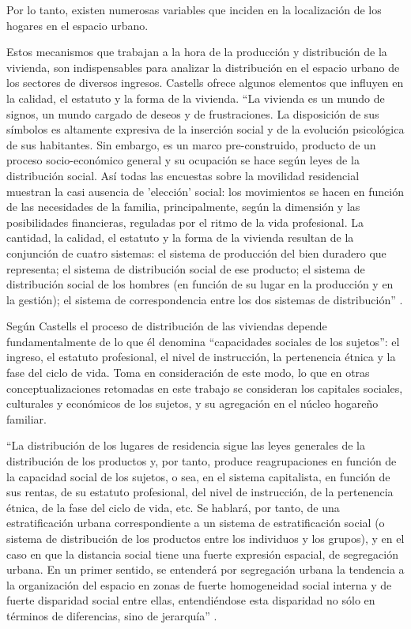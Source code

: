 Por lo tanto, existen numerosas variables que inciden en la localización de los hogares en el espacio urbano.

Estos mecanismos que trabajan a la hora de la producción y distribución de la vivienda, son indispensables para analizar la distribución en el espacio urbano de los sectores de diversos ingresos. Castells ofrece algunos elementos que influyen en la calidad, el estatuto y la forma de la vivienda. “La vivienda es un mundo de signos, un mundo cargado de deseos y de frustraciones. La disposición de sus símbolos es altamente expresiva de la inserción social y de la evolución psicológica de sus habitantes. Sin embargo, es un marco pre-construido, producto de un proceso socio-económico general y su ocupación se hace según leyes de la distribución social. Así todas las encuestas sobre la movilidad residencial muestran la casi ausencia de 'elección' social: los movimientos se hacen en función de las necesidades de la familia, principalmente, según la dimensión y las posibilidades financieras, reguladas por el ritmo de la vida profesional. La cantidad, la calidad, el estatuto y la forma de la vivienda resultan de la conjunción de cuatro sistemas: el sistema de producción del bien duradero que representa; el sistema de distribución social de ese producto; el sistema de distribución social de los hombres (en función de su lugar en la producción y en la gestión); el sistema de correspondencia entre los dos sistemas de distribución” \cite[~202]{castells}.


Según Castells el proceso de distribución de las viviendas depende fundamentalmente de lo que él denomina “capacidades sociales de los sujetos”: el ingreso, el estatuto profesional, el nivel de instrucción, la pertenencia étnica y la fase del ciclo de vida. Toma en consideración de este modo, lo que en otras conceptualizaciones retomadas en este trabajo se consideran los capitales sociales, culturales y económicos de los sujetos, y su agregación en el núcleo hogareño familiar.

“La distribución de los lugares de residencia sigue las leyes generales de la distribución de los productos y, por tanto, produce reagrupaciones en función de la capacidad social de los sujetos, o sea, en el sistema capitalista, en función de sus rentas, de su estatuto profesional, del nivel de instrucción, de la pertenencia étnica, de la fase del ciclo de vida, etc. Se hablará, por tanto, de una estratificación urbana correspondiente a un sistema de estratificación social (o sistema de distribución de los productos entre los individuos y los grupos), y en el caso en que la distancia social tiene una fuerte expresión espacial, de segregación urbana. En un primer sentido, se entenderá por segregación urbana la tendencia a la organización del espacio en zonas de fuerte homogeneidad social interna y de fuerte disparidad social entre ellas, entendiéndose esta disparidad no sólo en términos de diferencias, sino de jerarquía” \cite[~205]{castells}.

